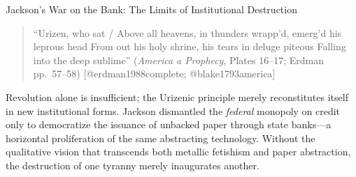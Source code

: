 \documentclass[
  ignorenonframetext,
]{beamer}
\begin{document}
\begin{frame}{Jackson's War on the Bank: The Limits of Institutional
Destruction}
\begin{quote}
``Urizen, who sat / Above all heavens, in thunders wrapp'd, emerg'd his
leprous head From out his holy shrine, his tears in deluge piteous
Falling into the deep sublime'' (\emph{America a Prophecy}, Plates
16--17; Erdman pp.~57--58) {[}@erdman1988complete; @blake1793america{]}
\end{quote}

Revolution alone is insufficient; the Urizenic principle merely
reconstitutes itself in new institutional forms. Jackson dismantled the
\emph{federal} monopoly on credit only to democratize the issuance of
unbacked paper through state banks---a horizontal proliferation of the
same abstracting technology. Without the qualitative vision that
transcends both metallic fetishism and paper abstraction, the
destruction of one tyranny merely inaugurates another.
\end{frame}
\end{document}
